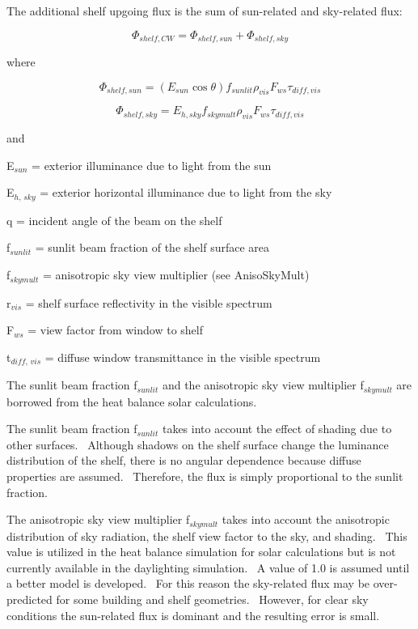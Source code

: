 The additional shelf upgoing flux is the sum of sun-related and sky-related flux:

\begin{equation}
{\Phi_{shelf,CW}} = {\Phi_{shelf,sun}} + {\Phi_{shelf,sky}}
\end{equation}

where

\begin{equation}
{\Phi_{shelf,sun}} = \left( {{E_{sun}}\cos \theta } \right){f_{sunlit}}{\rho_{vis}}{F_{ws}}{\tau_{diff,vis}}
\end{equation}

\begin{equation}
{\Phi_{shelf,sky}} = {E_{h,sky}}{f_{skymult}}{\rho_{vis}}{F_{ws}}{\tau_{diff,vis}}
\end{equation}

and

E\(_{sun}\) = exterior illuminance due to light from the sun

E\(_{h,\,sky}\) = exterior horizontal illuminance due to light from the sky

q = incident angle of the beam on the shelf

f\(_{sunlit}\) = sunlit beam fraction of the shelf surface area

f\(_{skymult}\) = anisotropic sky view multiplier (see AnisoSkyMult)

r\(_{vis}\) = shelf surface reflectivity in the visible spectrum

F\(_{ws}\) = view factor from window to shelf

t\(_{diff,\, vis}\) = diffuse window transmittance in the visible spectrum

The sunlit beam fraction f\(_{sunlit}\) and the anisotropic sky view multiplier f\(_{skymult}\) are borrowed from the heat balance solar calculations.

The sunlit beam fraction f\(_{sunlit}\) takes into account the effect of shading due to other surfaces.~ Although shadows on the shelf surface change the luminance distribution of the shelf, there is no angular dependence because diffuse properties are assumed.~ Therefore, the flux is simply proportional to the sunlit fraction.

The anisotropic sky view multiplier f\(_{skymult}\) takes into account the anisotropic distribution of sky radiation, the shelf view factor to the sky, and shading.~ This value is utilized in the heat balance simulation for solar calculations but is not currently available in the daylighting simulation.~ A value of 1.0 is assumed until a better model is developed.~ For this reason the sky-related flux may be over-predicted for some building and shelf geometries.~ However, for clear sky conditions the sun-related flux is dominant and the resulting error is small.

